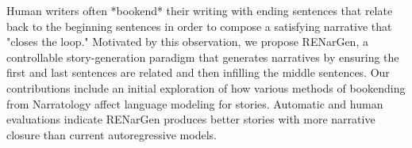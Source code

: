 Human writers often *bookend* their writing with ending sentences that relate back to the beginning sentences in order to compose a satisfying narrative that "closes the loop." Motivated by this observation, we propose RENarGen, a controllable story-generation paradigm that generates narratives by ensuring the first and last sentences are related and then infilling the middle sentences. Our contributions include an initial exploration of how various methods of bookending from Narratology affect language modeling for stories. Automatic and human evaluations indicate RENarGen produces better stories with more narrative closure than current autoregressive models.